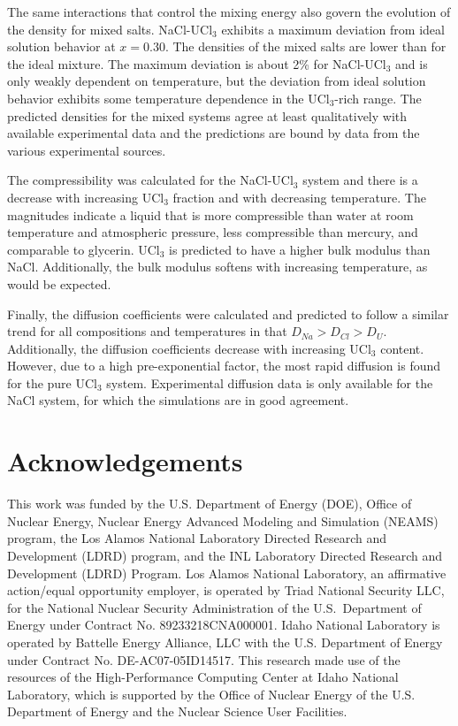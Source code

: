 \documentclass[preprint,3p,10pt,onecolumn,number,sort&compress]{elsarticle}
\begin{document}
The same interactions that control the mixing energy also govern the evolution of the density for mixed salts. NaCl-UCl$_3$ exhibits a maximum deviation from ideal solution behavior at $x=0.30$. The densities of the mixed salts are lower than for the ideal mixture. The maximum deviation is about 2\% for NaCl-UCl$_3$ and is only weakly dependent on temperature, but the deviation from ideal solution behavior exhibits some temperature dependence in the UCl$_3$-rich range. 
 The predicted densities for the mixed systems agree at least qualitatively with available experimental data and the predictions are bound by data from the various experimental sources. 

The compressibility was calculated for the NaCl-UCl$_3$ system and there is a decrease with increasing UCl$_3$ fraction and with decreasing temperature. The magnitudes indicate a liquid that is more compressible than water at room temperature and atmospheric pressure, less compressible than mercury, and comparable to glycerin. UCl$_3$ is predicted to have a higher bulk modulus than NaCl. Additionally, the bulk modulus softens with increasing temperature, as would be expected. 

Finally, the diffusion coefficients were calculated and predicted to follow a similar trend for all compositions and temperatures in that $D_{Na} > D_{Cl} > D_{U}$. Additionally, the diffusion coefficients decrease with increasing UCl$_3$ content. However, due to a high pre-exponential factor, the most rapid diffusion is found for the pure UCl$_3$ system. Experimental diffusion data is only available for the NaCl system, for which the simulations are in good agreement. 

\section*{Acknowledgements}
This work was funded by the U.S. Department of Energy (DOE), Office of Nuclear Energy, Nuclear Energy Advanced Modeling and Simulation (NEAMS) program, the Los Alamos National Laboratory Directed Research and Development (LDRD) program, and the INL Laboratory Directed Research and Development (LDRD) Program. Los Alamos National Laboratory, an affirmative action/equal opportunity employer, is operated by Triad National Security LLC, for the National Nuclear Security Administration of the U.S.\ Department of Energy under Contract No. 89233218CNA000001. Idaho National Laboratory is operated by Battelle Energy Alliance, LLC with the U.S. Department of Energy under Contract No. DE-AC07-05ID14517. This research made use of the resources of the High-Performance Computing Center at Idaho National Laboratory, which is supported by the Office of Nuclear Energy of the U.S. Department of Energy and the Nuclear Science User Facilities.       


 

\end{document}
